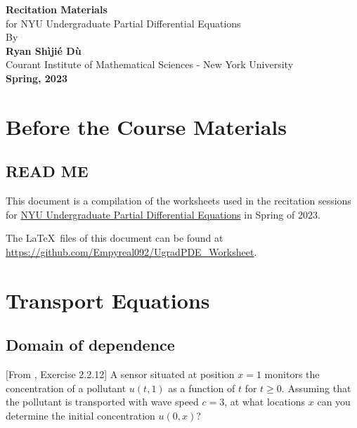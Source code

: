 \documentclass[11pt,letterpaper]{report}
\begin{document}
\begin{titlepage}
    \begin{center}
        \vspace*{4cm}
        \Huge
        \textbf{Recitation Materials} \\
        \vspace{0.5cm}
        \LARGE
        {for NYU Undergraduate Partial Differential Equations}\\
        \vspace{3cm}
        By\\
        \vspace{0.5cm}
        \textbf{Ryan Sh\`iji\'e D\`u}\\
        \vspace{0.2cm}
        \normalsize
        {Courant Institute of Mathematical Sciences - New York University}\\
        \vspace{2cm}
        \Large
        \textbf{Spring, 2023}
        
    \end{center}
\end{titlepage}

\setcounter{tocdepth}{1}
\tableofcontents

\setcounter{chapter}{-1}
\chapter{Before the Course Materials}
\section{READ ME}
This document is a compilation of the worksheets used in the recitation sessions for \href{https://math.nyu.edu/dynamic/courses/undergrad/math-ua-263/}{NYU Undergraduate Partial Differential Equations} in Spring of 2023. 

The \LaTeX\ files of this document can be found at \url{https://github.com/Empyreal092/UgradPDE_Worksheet}.


\chapter{Transport Equations}
\section{Domain of dependence}
[From \cite{Olver_14}, Exercise 2.2.12] A sensor situated at position $x=1$ monitors the concentration of a pollutant $u(t,1)$ as a function of $t$ for $t\geq 0$. Assuming that the pollutant is transported with wave speed $c=3$, at what locations $x$ can you determine the initial concentration $u(0,x)$? 
\end{document}
